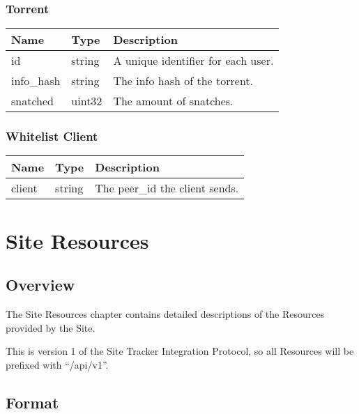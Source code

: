 \documentclass[10pt,letterpaper,titlepage]{report}
\begin{document}
\subsection{Torrent}

\begin{center}
	\begin{tabular}{| p{2cm} | p{2cm} | p{7cm} |}
		\hline
	
		\textbf{Name} & \textbf{Type} & \textbf{Description} \\ \hline
		
		id & string & A unique identifier for each user. \\ \hline
		info\_hash & string & The info hash of the torrent. \\ \hline
		snatched & uint32 & The amount of snatches. \\ \hline
	\end{tabular}
\end{center}

\subsection{Whitelist Client}

\begin{center}
	\begin{tabular}{| p{2cm} | p{2cm} | p{7cm} |}
		\hline
	
		\textbf{Name} & \textbf{Type} & \textbf{Description} \\ \hline
		
		client & string & The peer\_id the client sends. \\ \hline
	\end{tabular}
\end{center}

\chapter{Site Resources}

\section{Overview}

The Site Resources chapter contains detailed descriptions of the Resources provided by the Site.

This is version 1 of the Site Tracker Integration Protocol, so all Resources will be prefixed with ``/api/v1''.

\section{Format}
\end{document}
